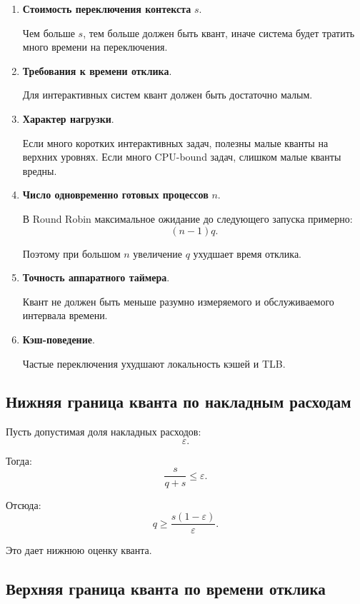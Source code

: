 \documentclass[12pt,a4paper]{article}
\begin{document}
\begin{enumerate}
    \item \textbf{Стоимость переключения контекста} $s$.

    Чем больше $s$, тем больше должен быть квант, иначе система будет тратить много времени на переключения.

    \item \textbf{Требования к времени отклика}.

    Для интерактивных систем квант должен быть достаточно малым.

    \item \textbf{Характер нагрузки}.

    Если много коротких интерактивных задач, полезны малые кванты на верхних уровнях. Если много CPU-bound задач, слишком малые кванты вредны.

    \item \textbf{Число одновременно готовых процессов} $n$.

    В Round Robin максимальное ожидание до следующего запуска примерно:
    \[
    (n-1)q.
    \]

    Поэтому при большом $n$ увеличение $q$ ухудшает время отклика.

    \item \textbf{Точность аппаратного таймера}.

    Квант не должен быть меньше разумно измеряемого и обслуживаемого интервала времени.

    \item \textbf{Кэш-поведение}.

    Частые переключения ухудшают локальность кэшей и TLB.
\end{enumerate}

\subsection{Нижняя граница кванта по накладным расходам}

Пусть допустимая доля накладных расходов:
\[
\varepsilon.
\]

Тогда:
\[
\frac{s}{q+s} \leq \varepsilon.
\]

Отсюда:
\[
q \geq \frac{s(1-\varepsilon)}{\varepsilon}.
\]

Это дает нижнюю оценку кванта.

\subsection{Верхняя граница кванта по времени отклика}
\end{document}
